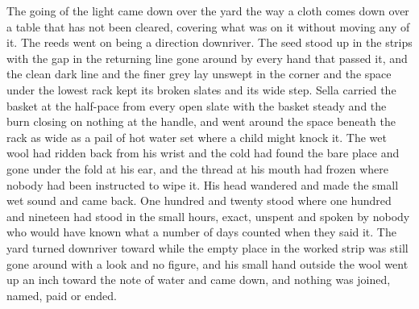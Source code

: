 The going of the light came down over the yard the way a cloth comes down over a table that has not been cleared, covering what was on it without moving any of it. The reeds went on being a direction downriver. The seed stood up in the strips with the gap in the returning line gone around by every hand that passed it, and the clean dark line and the finer grey lay unswept in the corner and the space under the lowest rack kept its broken slates and its wide step. Sella carried the basket at the half-pace from every open slate with the basket steady and the burn closing on nothing at the handle, and went around the space beneath the rack as wide as a pail of hot water set where a child might knock it. The wet wool had ridden back from his wrist and the cold had found the bare place and gone under the fold at his ear, and the thread at his mouth had frozen where nobody had been instructed to wipe it. His head wandered and made the small wet sound and came back. One hundred and twenty stood where one hundred and nineteen had stood in the small hours, exact, unspent and spoken by nobody who would have known what a number of days counted when they said it. The yard turned downriver toward  while the empty place in the worked strip was still gone around with a look and no figure, and his small hand outside the wool went up an inch toward the note of water and came down, and nothing was joined, named, paid or ended.
